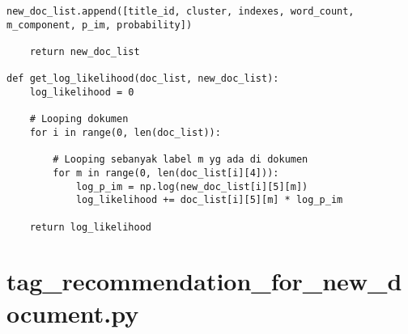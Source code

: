 \begin{lstlisting}[breaklines=true]
		new_doc_list.append([title_id, cluster, indexes, word_count, m_component, p_im, probability])
			
	return new_doc_list

def get_log_likelihood(doc_list, new_doc_list):
	log_likelihood = 0
			
	# Looping dokumen
	for i in range(0, len(doc_list)):
			
		# Looping sebanyak label m yg ada di dokumen
		for m in range(0, len(doc_list[i][4])):  
			log_p_im = np.log(new_doc_list[i][5][m])
			log_likelihood += doc_list[i][5][m] * log_p_im
			
	return log_likelihood
\end{lstlisting}

\chapter{tag\_recommendation\_for\_new\_document.py}
